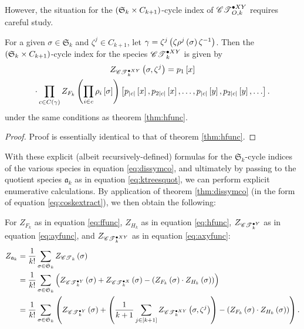 \documentclass[sectionflow,singlespace,twoside,boldmathhdr]{brandiss} %
\numberwithin{section}{chapter}
\numberwithin{figure}{chapter}
\begin{document}
However, the situation for the $\pbrac{\mathfrak{S}_{k} \times C_{k+1}}$-cycle index of $\pointed[XY]{\specname{CT}}_{O, k}$ requires careful study.
\begin{theorem}
  \label{thm:axyfunc}
  For a given $\sigma \in \mathfrak{S}_{k}$ and $\zeta^{j} \in C_{k+1}$, let $\gamma = \zeta^{j} \pbrac{\zeta \rho^{j} \pbrac{\sigma} \zeta^{-1}}$.
  Then the $\pbrac{\mathfrak{S}_{k} \times C_{k+1}}$-cycle index for the species $\pointed[XY]{\specname{CT}}_{k}$ is given by
  \begin{multline}
    \label{eq:axyfunc}
    Z_{\pointed[XY]{\specname{CT}}_{k}} \pbrac{\sigma, \zeta^{j}} = p_{1} \sbrac{x} \\
    \cdot \prod_{c \in C \pbrac{\gamma}} Z_{F_{k}} \pbrac{\prod_{i \in c} \rho_{i} \sbrac{\sigma}} \sbrac{p_{\abs{c}} \sbrac{x}, p_{2 \abs{c}} \sbrac{x}, \dots, p_{\abs{c}} \sbrac{y}, p_{2 \abs{c}} \sbrac{y}, \dots}.
  \end{multline}
  under the same conditions as theorem \ref{thm:hfunc}.
\end{theorem}

\begin{proof}
  Proof is essentially identical to that of theorem \ref{thm:hfunc}.
\end{proof}

With these explicit (albeit recursively-defined) formulas for the $\mathfrak{S}_{k}$-cycle indices of the various species in equation \eqref{eq:dissymco}, and ultimately by passing to the quotient species $\mathfrak{a}_{k}$ as in equation \eqref{eq:ktreesquot}, we can perform explicit enumerative calculations.
By application of theorem \ref{thm:dissymco} (in the form of equation \eqref{eq:coskextract}), we then obtain the following:

\begin{theorem}
  \label{thm:ktreecyc}
  For $Z_{F_{k}}$ as in equation \eqref{eq:ffunc}, $Z_{H_{k}}$ as in equation \eqref{eq:hfunc}, $Z_{\pointed[Y]{\specname{CT}}_{k}}$ as in equation \eqref{eq:ayfunc}, and $Z_{\pointed[XY]{\specname{CT}}_{k}}$ as in equation \eqref{eq:axyfunc}:
  \begin{subequations}
    \begin{align}
      Z_{\mathfrak{a}_{k}} &= \frac{1}{k!} \sum_{\sigma \in \mathfrak{S}_{k}} Z_{\specname{CT}_{k}} \pbrac{\sigma} \\
      &= \frac{1}{k!} \sum_{\sigma \in \mathfrak{S}_{k}} \pbrac{Z_{\pointed[Y]{\specname{CT}}_{k}} \pbrac{\sigma} + Z_{\pointed[X]{\specname{CT}}_{k}} \pbrac{\sigma} - \pbrac{Z_{F_{k}} \pbrac{\sigma} \cdot Z_{H_{k}} \pbrac{\sigma}}} \\
      &= \frac{1}{k!} \sum_{\sigma \in \mathfrak{S}_{k}} \pbrac{Z_{\pointed[Y]{\specname{CT}}_{k}} \pbrac{\sigma} + \pbrac{\frac{1}{k+1} \sum_{j \in \sbrac{k+1}} Z_{\pointed[XY]{\specname{CT}}_{k}} \pbrac{\sigma, \zeta^{j}}} - \pbrac{Z_{F_{k}} \pbrac{\sigma} \cdot Z_{H_{k}} \pbrac{\sigma}}}.
    \end{align}
  \end{subequations}

\end{theorem}
\end{document}
